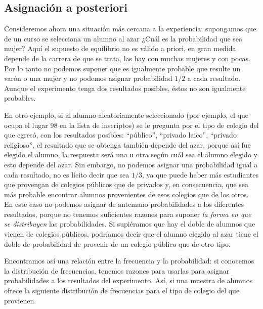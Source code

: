 \documentclass[]{book}
\begin{document}
\hypertarget{asignaciuxf3n-a-posteriori}{%
\subsection{Asignación a posteriori}\label{asignaciuxf3n-a-posteriori}}

Consideremos ahora una situación más cercana a la experiencia:
supongamos que de un curso se selecciona un alumno al azar ¿Cuál es la
probabilidad que sea mujer? Aquí el supuesto de equilibrio no es válido
a priori, en gran medida depende de la carrera de que se trata, las hay
con muchas mujeres y con pocas. Por lo tanto no podemos suponer que es
igualmente probable que resulte un varón o una mujer y no podemos
asignar probabilidad \(1/2\) a cada resultado. Aunque el experimento tenga dos
resultados posibles, éstos no son igualmente probables.

En otro ejemplo, si al alumno aleatoriamente seleccionado (por ejemplo, el que ocupa el lugar 98 en la lista de inscriptos) se le pregunta
por el tipo de colegio del que egresó, con los resultados posibles:
``público'', ``privado laico'', ``privado religioso'', el resultado que se
obtenga también depende del azar, porque así fue elegido el alumno, la
respuesta será una u otra según cuál sea el alumno elegido y esto
depende del azar. Sin embargo, no podemos asignar una probabilidad igual
a cada resultado, no es lícito decir que sea \(1/3\), ya que puede haber más
estudiantes que provengan de colegios públicos que de privados y, en
consecuencia, que sea más probable encontrar alumnos provenientes de
esos colegios que de los otros. En este caso no podemos asignar de
antemano probabilidades a los diferentes resultados, porque no tenemos
suficientes razones para suponer \emph{la forma en que se distribuyen} las
probabilidades. Si supiéramos que hay el doble de alumnos que vienen de
colegios públicos, podríamos decir que el alumno elegido al azar tiene
el doble de probabilidad de provenir de un colegio público que de otro
tipo.

Encontramos así una relación entre la frecuencia y la probabilidad: si
conocemos la distribución de frecuencias, tenemos razones para usarlas
para asignar probabilidades a los resultados del experimento. Así, si
una muestra de alumnos ofrece la siguiente distribución de frecuencias
para el tipo de colegio del que provienen.
\end{document}
